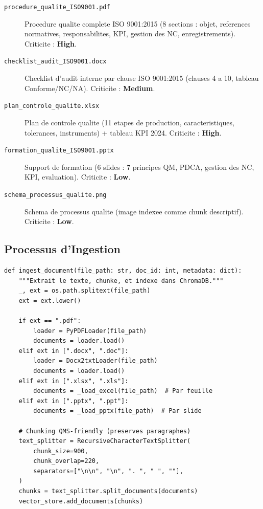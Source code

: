 \documentclass[12pt,a4paper]{article}
\begin{document}
\begin{infobox}
\begin{description}
  \item[\texttt{procedure\_qualite\_ISO9001.pdf}] Procedure qualite complete ISO 9001:2015
    (8 sections : objet, references normatives, responsabilites, KPI, gestion des NC,
    enregistrements). Criticite : \textbf{High}.
  \item[\texttt{checklist\_audit\_ISO9001.docx}] Checklist d'audit interne par clause
    ISO 9001:2015 (clauses 4 a 10, tableau Conforme/NC/NA). Criticite : \textbf{Medium}.
  \item[\texttt{plan\_controle\_qualite.xlsx}] Plan de controle qualite (11 etapes de
    production, caracteristiques, tolerances, instruments) + tableau KPI 2024.
    Criticite : \textbf{High}.
  \item[\texttt{formation\_qualite\_ISO9001.pptx}] Support de formation (6 slides :
    7 principes QM, PDCA, gestion des NC, KPI, evaluation). Criticite : \textbf{Low}.
  \item[\texttt{schema\_processus\_qualite.png}] Schema de processus qualite (image indexee
    comme chunk descriptif). Criticite : \textbf{Low}.
\end{description}
\end{infobox}

\subsection{Processus d'Ingestion}

\begin{lstlisting}[style=pythonstyle, caption={Fonction d'ingestion multi-format (rag.py)}]
def ingest_document(file_path: str, doc_id: int, metadata: dict):
    """Extrait le texte, chunke, et indexe dans ChromaDB."""
    _, ext = os.path.splitext(file_path)
    ext = ext.lower()

    if ext == ".pdf":
        loader = PyPDFLoader(file_path)
        documents = loader.load()
    elif ext in [".docx", ".doc"]:
        loader = Docx2txtLoader(file_path)
        documents = loader.load()
    elif ext in [".xlsx", ".xls"]:
        documents = _load_excel(file_path)  # Par feuille
    elif ext in [".pptx", ".ppt"]:
        documents = _load_pptx(file_path)  # Par slide

    # Chunking QMS-friendly (preserves paragraphes)
    text_splitter = RecursiveCharacterTextSplitter(
        chunk_size=900,
        chunk_overlap=220,
        separators=["\n\n", "\n", ". ", " ", ""],
    )
    chunks = text_splitter.split_documents(documents)
    vector_store.add_documents(chunks)
\end{lstlisting}
\end{document}
